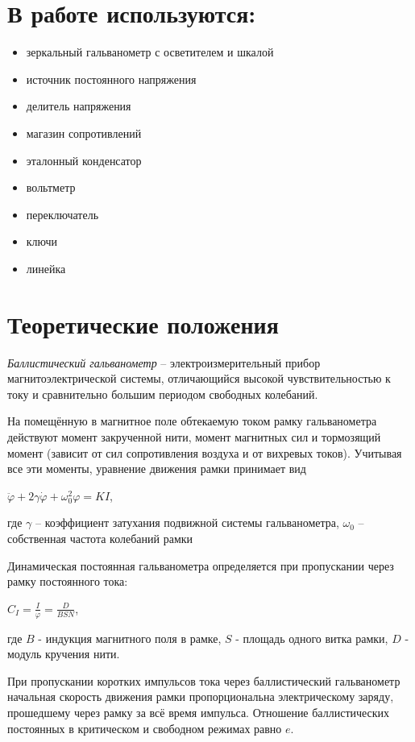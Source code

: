 \documentclass[a4paper, 12pt]{article}
\begin{document}
\section{В работе используются:}
\begin{itemize}
    \item зеркальный гальванометр с осветителем и шкалой
    \item источник постоянного напряжения
    \item делитель напряжения
    \item магазин сопротивлений
    \item эталонный конденсатор
    \item вольтметр
    \item переключатель
    \item ключи
    \item линейка
\end{itemize}

\section{Теоретические положения}

\textit{Баллистический гальванометр} -- электроизмерительный прибор магнитоэлектрической системы, отличающийся высокой чувствительностью к току и сравнительно большим периодом свободных колебаний. \par
На помещённую в магнитное поле обтекаемую током рамку гальванометра действуют момент закрученной нити, момент магнитных сил и тормозящий момент (зависит от сил сопротивления воздуха и от вихревых токов). Учитывая все эти моменты, уравнение движения рамки принимает вид
\begin{center}
    $\ddot \varphi + 2 \gamma \dot \varphi + \omega_0^2\varphi = KI $,
\end{center}
где $\gamma$ -- коэффициент затухания подвижной системы гальванометра, $\omega_0$ -- собственная частота колебаний рамки

Динамическая постоянная гальванометра определяется при пропускании через рамку постоянного тока:
\begin{center}
    $C_I = \frac{I}{\varphi} = \frac{D}{BSN}$,
\end{center}
где $B$ - индукция магнитного поля в рамке, $S$ - площадь одного витка рамки, $D$ - модуль кручения нити. \par
При пропускании коротких импульсов тока через баллистический гальванометр начальная скорость движения рамки пропорциональна электрическому заряду, прошедшему через рамку за всё время импульса. Отношение баллистических постоянных в критическом и свободном режимах равно $e$.
\end{document}
